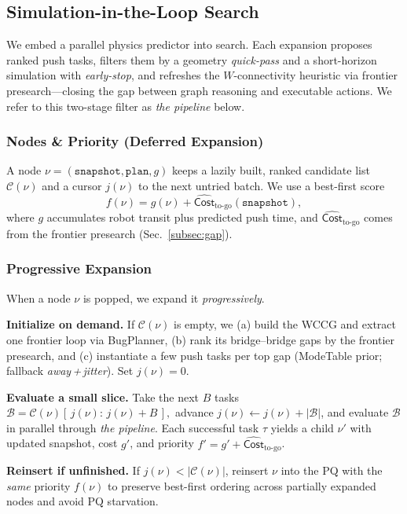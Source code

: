 \subsection{Simulation-in-the-Loop Search}
\label{subsec:simloop}
We embed a parallel physics predictor into search. Each expansion proposes ranked push tasks, filters them by a geometry \emph{quick-pass} and a short-horizon simulation with \emph{early-stop}, and refreshes the $W$-connectivity heuristic via frontier presearch—closing the gap between graph reasoning and executable actions. We refer to this two-stage filter as \emph{the pipeline} below.

\subsubsection{Nodes \& Priority (Deferred Expansion)}
A node $\nu=(\texttt{snapshot},\texttt{plan},g)$ keeps a lazily built, ranked candidate list $\mathcal{C}(\nu)$ and a cursor $j(\nu)$ to the next untried batch. We use a best-first score
\[
f(\nu)=g(\nu)+\widehat{\mathsf{Cost}}_{\text{to-go}}(\texttt{snapshot}),
\]
where $g$ accumulates robot transit plus predicted push time, and $\widehat{\mathsf{Cost}}_{\text{to-go}}$ comes from the frontier presearch (Sec.~\ref{subsec:gap}).

\subsubsection{Progressive Expansion}
When a node \(\nu\) is popped, we expand it \emph{progressively}.

\textbf{Initialize on demand.}
If \(\mathcal{C}(\nu)\) is empty, we (a) build the WCCG and extract one frontier loop via BugPlanner, (b) rank its bridge–bridge gaps by the frontier presearch, and (c) instantiate a few push tasks per top gap (ModeTable prior; fallback \emph{away\,+\,jitter}). Set \(j(\nu)=0\).

\textbf{Evaluate a small slice.}
Take the next \(B\) tasks
\(
\mathcal{B}=\mathcal{C}(\nu)[\,j(\nu):\,j(\nu){+}B\,],
\)
advance \(j(\nu)\!\leftarrow\!j(\nu){+}|\mathcal{B}|\),
and evaluate \(\mathcal{B}\) in parallel through \emph{the pipeline}.
Each successful task \(\tau\) yields a child \(\nu'\) with updated snapshot, cost \(g'\), and priority \(f'=g'+\widehat{\mathsf{Cost}}_{\text{to-go}}\).

\textbf{Reinsert if unfinished.}
If \(j(\nu)<|\mathcal{C}(\nu)|\), reinsert \(\nu\) into the PQ with the \emph{same} priority \(f(\nu)\) to preserve best-first ordering across partially expanded nodes and avoid PQ starvation.

